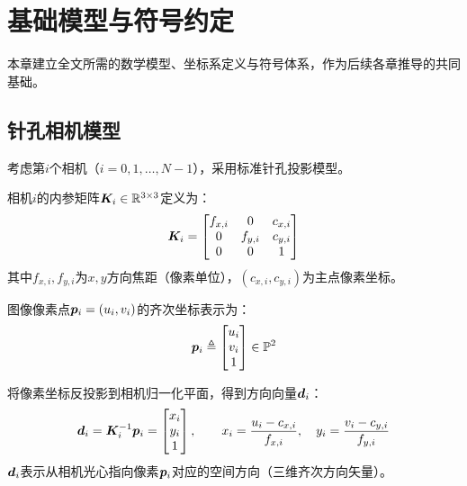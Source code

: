 \section{基础模型与符号约定}
\label{sec:fundamentals}

本章建立全文所需的数学模型、坐标系定义与符号体系，作为后续各章推导的共同基础。

\subsection{针孔相机模型}
\label{sec:pinhole}

考虑第$i$个相机（$i = 0,1,\dots,N-1$），采用标准针孔投影模型。

\begin{definition}[内参矩阵]
相机$i$的内参矩阵$\bm{K}_i \in \mathbb{R}^{3\times 3}$定义为：
\begin{equation}
\bm{K}_i =
\begin{bmatrix}
f_{x,i} & 0      & c_{x,i} \\
0       & f_{y,i} & c_{y,i} \\
0       & 0       & 1
\end{bmatrix}
\label{eq:Ki}
\end{equation}
其中$f_{x,i}, f_{y,i}$为$x,y$方向焦距（像素单位），$(c_{x,i}, c_{y,i})$为主点像素坐标。
\end{definition}

\begin{definition}[像素齐次坐标]
图像像素点$\bm{p}_i = (u_i, v_i)$的齐次坐标表示为：
\begin{equation}
\bm{p}_i \triangleq
\begin{bmatrix}
u_i \\ v_i \\ 1
\end{bmatrix} \in \mathbb{P}^2
\label{eq:pi}
\end{equation}
\end{definition}

\begin{definition}[归一化方向向量]
将像素坐标反投影到相机归一化平面，得到方向向量$\bm{d}_i$：
\begin{equation}
\bm{d}_i  = \bm{K}_i^{-1} \bm{p}_i  =
\begin{bmatrix}
x_i \\ y_i \\ 1
\end{bmatrix},
\qquad
x_i = \frac{u_i - c_{x,i}}{f_{x,i}},\quad
y_i = \frac{v_i - c_{y,i}}{f_{y,i}}
\label{eq:di}
\end{equation}
$\bm{d}_i$表示从相机光心指向像素$\bm{p}_i$对应的空间方向（三维齐次方向矢量）。
\end{definition}

